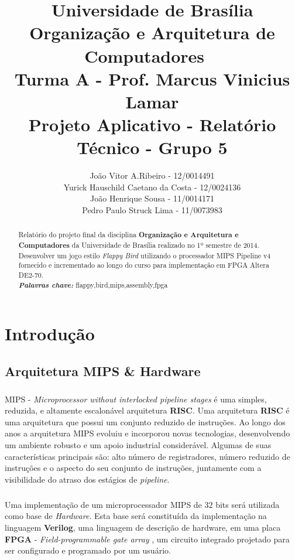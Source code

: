 \documentclass[notitlepage]{report}
\title{Universidade de Brasília \\ Organização e Arquitetura de Computadores \ \\ Turma A - Prof. Marcus Vinicius Lamar \\ \textbf{Projeto Aplicativo} - Relatório Técnico   - Grupo \textbf{5} }
\author{João Vitor A.Ribeiro - 12/0014491\\Yurick Hauschild Caetano da Costa - 12/0024136\\João Henrique Sousa - 11/0014171\\Pedro Paulo Struck Lima - 11/0073983}
\providecommand{\keywords}[1]{\textbf{\textit{Palavras chave:}} #1}
\begin{document}
\maketitle

\begin{abstract}
{Relatório do projeto final da disciplina \textbf{Organização e Arquitetura e Computadores} da Universidade de Brasília realizado no 1º semestre de 2014. Desenvolver um jogo estilo \textit {Flappy Bird} utilizando o processador MIPS Pipeline v4 fornecido e incrementado ao longo do curso para implementação em FPGA Altera DE2-70.} \\

\keywords{flappy,bird,mips,assembly,fpga}

\end{abstract}
\pagebreak{}


\chapter{Introdução}
\section{Arquitetura MIPS \& Hardware}
\paragraph{}{MIPS  - \textit{Microprocessor without interlocked pipeline stages}  é uma simples, reduzida, e altamente escalonável arquitetura \textbf{RISC}. Uma arquitetura \textbf{RISC} é uma arquitetura que possui um conjunto reduzido de instruções. Ao longo dos anos a arquitetura MIPS evoluiu e incorporou novas tecnologias, desenvolvendo um ambiente robusto e um apoio industrial considerável. Algumas de suas características principais são: alto número de registradores, número reduzido de instruções e o aspecto do seu conjunto de instruções, juntamente com a visibilidade do atraso dos estágios de \textit{pipeline}.}\cite {IT14}

\paragraph{}{Uma implementação de um microprocessador MIPS de $ 32 $ bits será utilizada como base de \textit{Hardware}. Esta base será constituída da implementação na linguagem \textbf{Verilog}, uma linguagem de descrição de hardware,  em uma placa \textbf{FPGA} - \textit{Field-programmable gate array }, um circuito integrado projetado para ser configurado e programado por um usuário.}
\end{document}
